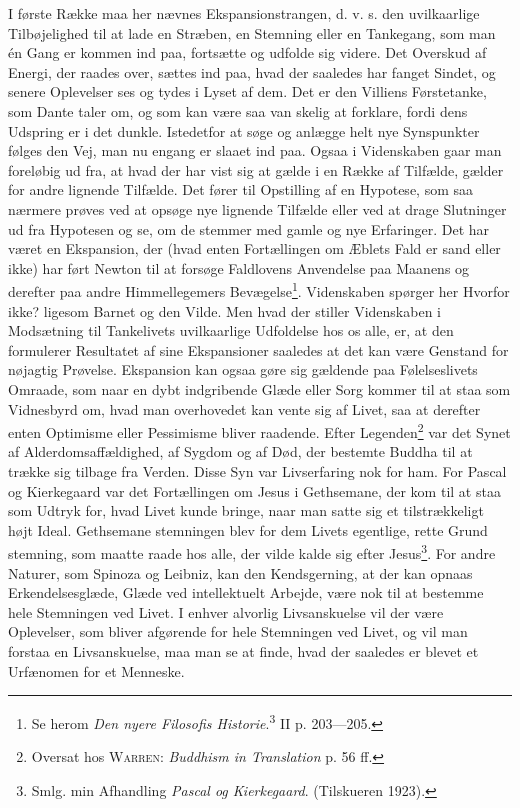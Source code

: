 \documentclass[12pt]{article}
\newcommand{\opage}[1]{\marginnote{\footnotesize\textit{[#1]}}}
\begin{document}
I første Række maa her nævnes Ekspansionstrangen, d. v. s. den
uvilkaarlige Tilbøjelighed til at lade en Stræben, en Stemning eller en
Tankegang, som man én Gang er kommen ind paa, fortsætte og udfolde sig
videre. Det Overskud af Energi, der raades over, sættes ind paa, hvad
der saaledes har fanget Sindet, og senere Oplevelser ses og tydes i
Lyset af dem. Det er den \guillemotright{}Villiens Førstetanke\guillemotleft{}, som Dante taler
om, og som kan være saa van%
\setcounter{footnote}{0}%
\opage{56}skelig at forklare, fordi dens Udspring er i det dunkle.
Istedetfor at søge og anlægge helt nye Synspunkter følges den Vej, man
nu engang er slaaet ind paa. Ogsaa i Videnskaben gaar man foreløbig ud
fra, at hvad der har vist sig at gælde i en Række af Tilfælde, gælder
for andre lignende Tilfælde. Det fører til Opstilling af en Hypotese,
som saa nærmere prøves ved at opsøge nye lignende Tilfælde eller ved
at drage Slutninger ud fra Hypotesen og se, om de stemmer med gamle og
nye Erfaringer. Det har været en Ekspansion, der (hvad enten
Fortællingen om Æblets Fald er sand eller ikke) har ført Newton til at
forsøge Faldlovens Anvendelse paa Maanens og derefter paa andre
Himmellegemers Bevægelse\footnote{Se herom \textit{Den nyere Filosofis
Historie}.\textsuperscript{3} II p. 203---205.}. Videnskaben spørger
her \guillemotright{}Hvorfor ikke?\guillemotleft{} ligesom Barnet og den Vilde. Men hvad der
stiller Videnskaben i Modsætning til Tankelivets uvilkaarlige
Udfoldelse hos os alle, er, at den formulerer Resultatet af sine
Ekspansioner saaledes at det kan være Genstand for nøjagtig Prøvelse.
Ekspansion kan ogsaa gøre sig gældende paa Følelseslivets Omraade, som
naar en dybt indgribende Glæde eller Sorg kommer til at staa som
Vidnesbyrd om, hvad man overhovedet kan vente sig af Livet, saa at
derefter enten Optimisme eller Pessimisme bliver raadende. Efter
Legenden\footnote{Oversat hos \textsc{Warren}: \textit{Buddhism in
Translation} p. 56 ff.} var det Synet af Alderdomsaffældighed, af
Sygdom og af Død, der bestemte Buddha til at trække sig tilbage fra
Verden. Disse Syn var Livserfaring nok for ham. For Pascal og
Kierkegaard var det Fortællingen om Jesus i Gethsemane, der kom til at
staa som Udtryk for, hvad Livet kunde bringe, naar man satte sig et
tilstrækkeligt højt Ideal.
Gethsemane stemningen blev for dem Livets egentlige, rette Grund%
\setcounter{footnote}{0}%
\opage{57}stemning, som maatte raade hos alle, der vilde kalde sig efter
Jesus\footnote{Smlg. min Afhandling \textit{Pascal og Kierkegaard}.
(Tilskueren 1923).}. For andre Naturer, som Spinoza og Leibniz, kan den
Kendsgerning, at der kan opnaas Erkendelsesglæde, Glæde ved
intellektuelt Arbejde, være nok til at bestemme hele Stemningen ved
Livet. I enhver alvorlig Livsanskuelse vil der være Oplevelser, som
bliver afgørende for hele Stemningen ved Livet, og vil man forstaa en
Livsanskuelse, maa man se at finde, hvad der saaledes er blevet et
\guillemotright{}Urfænomen\guillemotleft{} for et Menneske.
\end{document}

